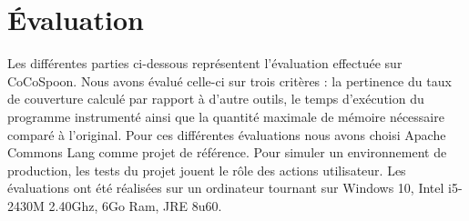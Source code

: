 \chapter{Évaluation}
	\thispagestyle{document}

Les différentes parties ci-dessous représentent l'évaluation effectuée sur CoCoSpoon. Nous avons évalué celle-ci sur trois critères : la pertinence du taux de couverture calculé par rapport à d'autre outils, le temps d'exécution du programme instrumenté ainsi que la quantité maximale de mémoire nécessaire comparé à l'original. Pour ces différentes évaluations nous avons choisi Apache Commons Lang comme projet de référence. Pour simuler un environnement de production, les tests du projet jouent le rôle des actions utilisateur. Les évaluations ont été réalisées sur un ordinateur tournant sur Windows 10, Intel i5-2430M 2.40Ghz, 6Go Ram, JRE 8u60.
	
		
		
		
		